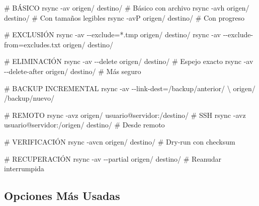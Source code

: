 \documentclass[
  doc,
  floatsintext,
  longtable,
  a4paper,
  nolmodern,
  notxfonts,
  notimes,
  12pt,
  colorlinks=true,linkcolor=blue,citecolor=blue,urlcolor=blue]{apa7}
\newenvironment{Shaded}{\begin{snugshade}}{\end{snugshade}}
\newcommand{\AttributeTok}[1]{\textcolor[rgb]{0.40,0.45,0.13}{#1}}
\newcommand{\CommentTok}[1]{\textcolor[rgb]{0.37,0.37,0.37}{#1}}
\newcommand{\DataTypeTok}[1]{\textcolor[rgb]{0.68,0.00,0.00}{#1}}
\newcommand{\FunctionTok}[1]{\textcolor[rgb]{0.28,0.35,0.67}{#1}}
\newcommand{\NormalTok}[1]{\textcolor[rgb]{0.00,0.23,0.31}{#1}}
\newcommand{\OperatorTok}[1]{\textcolor[rgb]{0.37,0.37,0.37}{#1}}
\newcommand{\StringTok}[1]{\textcolor[rgb]{0.13,0.47,0.30}{#1}}
\begin{document}
\begin{Shaded}
\begin{Highlighting}[]
\CommentTok{\# BÁSICO}
\FunctionTok{rsync} \AttributeTok{{-}av}\NormalTok{ origen/ destino/             }\CommentTok{\# Básico con archivo}
\FunctionTok{rsync} \AttributeTok{{-}avh}\NormalTok{ origen/ destino/            }\CommentTok{\# Con tamaños legibles}
\FunctionTok{rsync} \AttributeTok{{-}avP}\NormalTok{ origen/ destino/            }\CommentTok{\# Con progreso}

\CommentTok{\# EXCLUSIÓN}
\FunctionTok{rsync} \AttributeTok{{-}av} \AttributeTok{{-}{-}exclude}\OperatorTok{=}\StringTok{\textquotesingle{}*.tmp\textquotesingle{}}\NormalTok{ origen/ destino/}
\FunctionTok{rsync} \AttributeTok{{-}av} \AttributeTok{{-}{-}exclude{-}from}\OperatorTok{=}\NormalTok{excludes.txt origen/ destino/}

\CommentTok{\# ELIMINACIÓN}
\FunctionTok{rsync} \AttributeTok{{-}av} \AttributeTok{{-}{-}delete}\NormalTok{ origen/ destino/            }\CommentTok{\# Espejo exacto}
\FunctionTok{rsync} \AttributeTok{{-}av} \AttributeTok{{-}{-}delete{-}after}\NormalTok{ origen/ destino/      }\CommentTok{\# Más seguro}

\CommentTok{\# BACKUP INCREMENTAL}
\FunctionTok{rsync} \AttributeTok{{-}av} \AttributeTok{{-}{-}link{-}dest}\OperatorTok{=}\NormalTok{/backup/anterior/ }\DataTypeTok{\textbackslash{}}
\NormalTok{    origen/ /backup/nuevo/}

\CommentTok{\# REMOTO}
\FunctionTok{rsync} \AttributeTok{{-}avz}\NormalTok{ origen/ usuario@servidor:/destino/  }\CommentTok{\# SSH}
\FunctionTok{rsync} \AttributeTok{{-}avz}\NormalTok{ usuario@servidor:/origen/ destino/  }\CommentTok{\# Desde remoto}

\CommentTok{\# VERIFICACIÓN}
\FunctionTok{rsync} \AttributeTok{{-}avcn}\NormalTok{ origen/ destino/           }\CommentTok{\# Dry{-}run con checksum}

\CommentTok{\# RECUPERACIÓN}
\FunctionTok{rsync} \AttributeTok{{-}av} \AttributeTok{{-}{-}partial}\NormalTok{ origen/ destino/   }\CommentTok{\# Reanudar interrumpida}
\end{Highlighting}
\end{Shaded}

\subsection{Opciones Más Usadas}\label{opciones-muxe1s-usadas}
\end{document}
